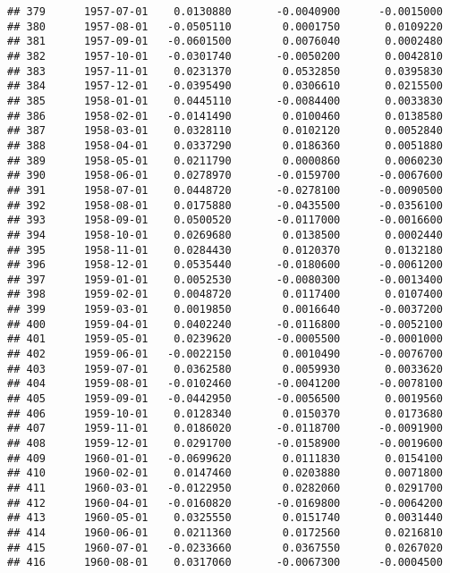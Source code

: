 \documentclass[
]{article}
\begin{document}
\begin{verbatim}
## 379      1957-07-01    0.0130880       -0.0040900      -0.0015000
## 380      1957-08-01   -0.0505110        0.0001750       0.0109220
## 381      1957-09-01   -0.0601500        0.0076040       0.0002480
## 382      1957-10-01   -0.0301740       -0.0050200       0.0042810
## 383      1957-11-01    0.0231370        0.0532850       0.0395830
## 384      1957-12-01   -0.0395490        0.0306610       0.0215500
## 385      1958-01-01    0.0445110       -0.0084400       0.0033830
## 386      1958-02-01   -0.0141490        0.0100460       0.0138580
## 387      1958-03-01    0.0328110        0.0102120       0.0052840
## 388      1958-04-01    0.0337290        0.0186360       0.0051880
## 389      1958-05-01    0.0211790        0.0000860       0.0060230
## 390      1958-06-01    0.0278970       -0.0159700      -0.0067600
## 391      1958-07-01    0.0448720       -0.0278100      -0.0090500
## 392      1958-08-01    0.0175880       -0.0435500      -0.0356100
## 393      1958-09-01    0.0500520       -0.0117000      -0.0016600
## 394      1958-10-01    0.0269680        0.0138500       0.0002440
## 395      1958-11-01    0.0284430        0.0120370       0.0132180
## 396      1958-12-01    0.0535440       -0.0180600      -0.0061200
## 397      1959-01-01    0.0052530       -0.0080300      -0.0013400
## 398      1959-02-01    0.0048720        0.0117400       0.0107400
## 399      1959-03-01    0.0019850        0.0016640      -0.0037200
## 400      1959-04-01    0.0402240       -0.0116800      -0.0052100
## 401      1959-05-01    0.0239620       -0.0005500      -0.0001000
## 402      1959-06-01   -0.0022150        0.0010490      -0.0076700
## 403      1959-07-01    0.0362580        0.0059930       0.0033620
## 404      1959-08-01   -0.0102460       -0.0041200      -0.0078100
## 405      1959-09-01   -0.0442950       -0.0056500       0.0019560
## 406      1959-10-01    0.0128340        0.0150370       0.0173680
## 407      1959-11-01    0.0186020       -0.0118700      -0.0091900
## 408      1959-12-01    0.0291700       -0.0158900      -0.0019600
## 409      1960-01-01   -0.0699620        0.0111830       0.0154100
## 410      1960-02-01    0.0147460        0.0203880       0.0071800
## 411      1960-03-01   -0.0122950        0.0282060       0.0291700
## 412      1960-04-01   -0.0160820       -0.0169800      -0.0064200
## 413      1960-05-01    0.0325550        0.0151740       0.0031440
## 414      1960-06-01    0.0211360        0.0172560       0.0216810
## 415      1960-07-01   -0.0233660        0.0367550       0.0267020
## 416      1960-08-01    0.0317060       -0.0067300      -0.0004500

\end{verbatim}
\end{document}
